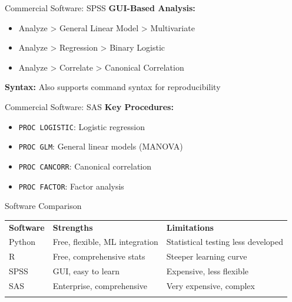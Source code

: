 \documentclass[aspectratio=169,ignorenonframetext]{beamer}
\begin{document}
\begin{frame}{Commercial Software: SPSS}
\textbf{GUI-Based Analysis:}

\begin{itemize}
\item
  Analyze \textgreater{} General Linear Model \textgreater{}
  Multivariate
\item
  Analyze \textgreater{} Regression \textgreater{} Binary Logistic
\item
  Analyze \textgreater{} Correlate \textgreater{} Canonical Correlation
\end{itemize}

\textbf{Syntax:} Also supports command syntax for reproducibility
\end{frame}

\begin{frame}[fragile]{Commercial Software: SAS}
\textbf{Key Procedures:}

\begin{itemize}
\item
  \texttt{PROC\ LOGISTIC}: Logistic regression
\item
  \texttt{PROC\ GLM}: General linear models (MANOVA)
\item
  \texttt{PROC\ CANCORR}: Canonical correlation
\item
  \texttt{PROC\ FACTOR}: Factor analysis
\end{itemize}
\end{frame}

\begin{frame}{Software Comparison}
{\def\LTcaptype{none} %
\begin{longtable}[]{@{}
  >{\raggedright\arraybackslash}p{}
  >{\raggedright\arraybackslash}p{}
  >{\raggedright\arraybackslash}p{}@{}}
\toprule\noalign{}
\endhead
\textbf{Software} & \textbf{Strengths} & \textbf{Limitations} \\
Python & Free, flexible, ML integration & Statistical testing less
developed \\
R & Free, comprehensive stats & Steeper learning curve \\
SPSS & GUI, easy to learn & Expensive, less flexible \\
SAS & Enterprise, comprehensive & Very expensive, complex \\
\bottomrule\noalign{}
\end{longtable}
}
\end{frame}
\end{document}
